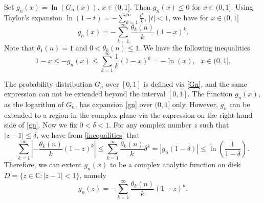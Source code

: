 \documentclass[11pt]{article}
\newtheorem{lemma}{\textbf{Lemma}}[section]
\numberwithin{equation}{section}
\begin{document}
Set $g_n(x)=\ln(G_n(x))$, $x\in(0,1]$. Then $g_n(x)\le 0$ for $x\in
(0,1]$. Using Taylor's expansion $\ln (1-t)=-\sum^\infty_{k=
1}\frac{t^k}{k}$, $|t|<1$, we have for $x\in(0,1]$
    \begin{equation}\label{gn}
    g_n(x)=-\sum_{k=1}^\infty \frac{\theta_k{(n)}}{k}(1-x)^k.
    \end{equation}
Note that $\theta_1(n)=1$ and $0<\theta_k(n)\le 1$. We have the
following inequalities
    \begin{equation}\label{inequalities}
 1-x\leq-g_{n}(x)\leq \sum_{k=1}^\infty \frac{1}{k}(1-x)^k =-\ln
(x),~~~x\in(0,1].
    \end{equation}



The probability distribution $G_n$ over $[0,1]$ is defined via
\eqref{Gn}, and the same expression can not be extended beyond the
interval $[0,1]$. The function $g_n(x)$, as the logarithm of $G_n$,
has expansion \eqref{gn} over $(0, 1]$ only.  However, $g_n$ can be
extended to a region in the complex plane via the expression on the
right-hand side of \eqref{gn}. Now we fix $0<\delta<1$. For any
complex number $z$ such that $|z-1|\leq \delta$, we have from
\eqref{inequalities} that
\begin{equation}\label{unif-bound}
  \sum_{k=1}^\infty \left|-\frac{\theta_k{(n)}}{k}(1-z)^k\right|\leq \sum_{k=1}^\infty \frac{\theta_k{(n)}}{k}\delta^k=|g_n(1-\delta)|\le
\ln(\frac{1}{1-\delta}).
\end{equation}
Therefore, we can extent $g_n(x)$ to be a complex analytic function
on disk $D=\{z\in\mathbb{C}: |z-1|<1\}$, namely
    \begin{equation}\label{equ:taylor g_n(x)}
    g_n(z)=-\sum_{k=1}^\infty \frac{\theta_k{(n)}}{k}(1-z)^k.
    \end{equation}


\end{document}
